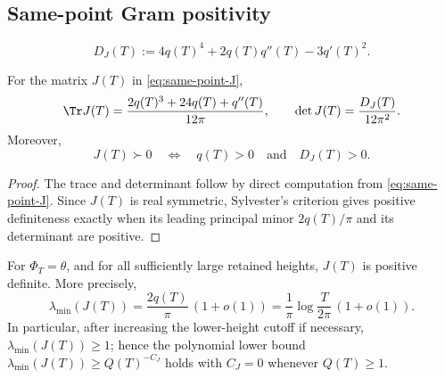 \subsection{Same-point Gram positivity}
\label{subsec:same-point-gram-positivity}

\begin{definition}
\label{def:same-point-gram-determinant}
\begin{equation}
\label{eq:same-point-gram-determinant}
D_J(T):=4q(T)^4+2q(T)q''(T)-3q'(T)^2.
\end{equation}
\end{definition}

\begin{lemma}
\label{lem:algebraic-same-point-gram-criterion}
For the matrix \(J(T)\) in \eqref{eq:same-point-J},
\begin{equation}
\label{eq:J-trace-det}
\Tr J(T)=\frac{2q(T)^3+24q(T)+q''(T)}{12\pi},
\qquad
\det J(T)=\frac{D_J(T)}{12\pi^2}.
\end{equation}
Moreover,
\[
        J(T)\succ0
        \quad\Longleftrightarrow\quad
        q(T)>0\quad\text{and}\quad D_J(T)>0.
\]
\end{lemma}

\begin{proof}
The trace and determinant follow by direct computation from
\eqref{eq:same-point-J}.  Since \(J(T)\) is real symmetric, Sylvester's
criterion gives positive definiteness exactly when its leading principal minor
\(2q(T)/\pi\) and its determinant are positive.
\end{proof}

\begin{lemma}
\label{lem:same-point-gram-positivity}
For \(\Phi_T=\theta\), and for all sufficiently large retained heights,
\(J(T)\) is positive definite.  More precisely,
\begin{equation}
\label{eq:lambda-min-asymptotic}
        \lambda_{\min}(J(T))
        =\frac{2q(T)}{\pi}\,(1+o(1))
        =\frac1\pi\log\frac{T}{2\pi}\,(1+o(1)).
\end{equation}
In particular, after increasing the lower-height cutoff if necessary,
\(\lambda_{\min}(J(T))\ge1\); hence the polynomial lower bound
\(\lambda_{\min}(J(T))\ge Q(T)^{-C_J}\) holds with \(C_J=0\) whenever
\(Q(T)\ge1\).
\end{lemma}

